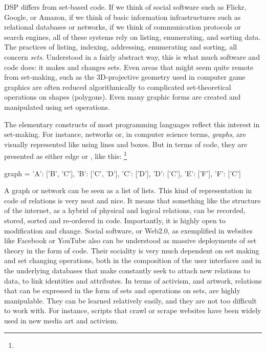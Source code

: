 DSP differs from set{}-based code. If we think of social software such
as Flickr, Google, or Amazon, if we think of basic information
infrastructures such as relational databases or networks, if we think
of communication protocols or search engines, all of these systems rely
on listing, enumerating, and sorting data. The practices of listing,
indexing, addressing, enumerating and sorting, all concern
{\em sets}. Understood in a fairly abstract way, this is what much
software and code does: it makes and changes sets. Even areas that
might seem quite remote from set{}-making, such as the 3D{}-projective
geometry used in computer game graphics are often reduced
algorithmically to complicated set{}-theoretical operations on shapes
(polygons). Even many graphic forms are created and manipulated using
set operations. 

The elementary constructs of most programming languages reflect this
interest in set{}-making. For instance, networks or, in computer
science terms, {\em graphs}, are visually represented like using
lines and boxes. But in terms of code, they are presented as either
edge or , like this: \footnote{}


\starttyping
graph = {'A': ['B', 'C'],
         'B': ['C', 'D'],
         'C': ['D'],
         'D': ['C'],
         'E': ['F'],
         'F': ['C']}
\stoptyping

A graph or network can be seen as a list of lists. This kind of
representation in code of relations is very neat and nice. It means
that something like the structure of the internet, as a hybrid of
physical and logical relations, can be recorded, stored, sorted and
re{}-ordered in code. Importantly, it is highly open to modification
and change. Social software, or Web2.0, as exemplified in websites like
Facebook or YouTube also can be understood as massive deployments of
set theory in the form of code. Their sociality is very much dependent
on set making and set changing operations, both in the composition of
the user interfaces and in the underlying databases that make
constantly seek to attach new relations to data, to link identities and
attributes. In terms of activism, and artwork, relations that can be
expressed in the form of sets and operations on sets, are highly
manipulable. They can be learned relatively easily, and they are not
too difficult to work with. For instance, scripts that crawl or scrape
websites have been widely used in new media art and activism.

